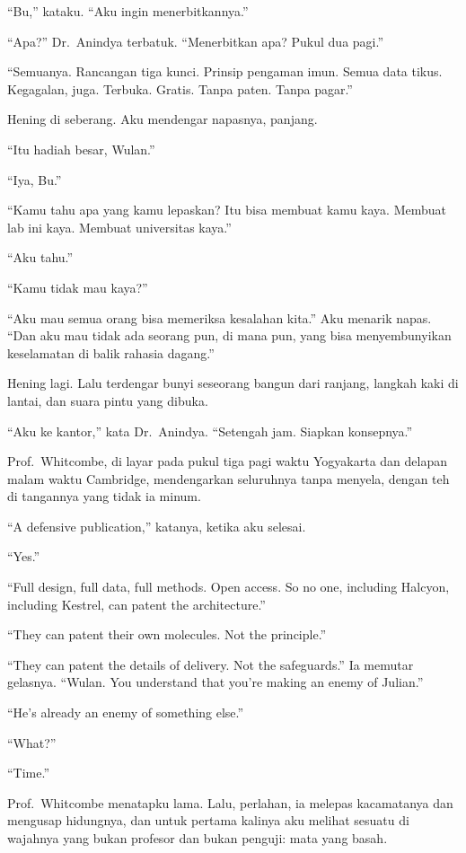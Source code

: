 \documentclass[11pt,twoside,openany]{book}
\makeatletter
\newcommand{\scenebreak}{\par\vspace{0.9em}{\centering\textsc{*\hspace{0.7em}*\hspace{0.7em}*}\par}\vspace{0.9em}\@afterindentfalse\@afterheading}
\makeatother
\begin{document}
``Bu,'' kataku. ``Aku ingin menerbitkannya.''

``Apa?'' Dr.~Anindya terbatuk. ``Menerbitkan apa? Pukul dua pagi.''

``Semuanya. Rancangan tiga kunci. Prinsip pengaman imun. Semua data tikus. Kegagalan, juga. Terbuka. Gratis. Tanpa paten. Tanpa pagar.''

Hening di seberang. Aku mendengar napasnya, panjang.

``Itu hadiah besar, Wulan.''

``Iya, Bu.''

``Kamu tahu apa yang kamu lepaskan? Itu bisa membuat kamu kaya. Membuat lab ini kaya. Membuat universitas kaya.''

``Aku tahu.''

``Kamu tidak mau kaya?''

``Aku mau semua orang bisa memeriksa kesalahan kita.'' Aku menarik napas. ``Dan aku mau tidak ada seorang pun, di mana pun, yang bisa menyembunyikan keselamatan di balik rahasia dagang.''

Hening lagi. Lalu terdengar bunyi seseorang bangun dari ranjang, langkah kaki di lantai, dan suara pintu yang dibuka.

``Aku ke kantor,'' kata Dr.~Anindya. ``Setengah jam. Siapkan konsepnya.''

\scenebreak
Prof.~Whitcombe, di layar pada pukul tiga pagi waktu Yogyakarta dan delapan malam waktu Cambridge, mendengarkan seluruhnya tanpa menyela, dengan teh di tangannya yang tidak ia minum.

``A defensive publication,'' katanya, ketika aku selesai.

``Yes.''

``Full design, full data, full methods. Open access. So no one, including Halcyon, including Kestrel, can patent the architecture.''

``They can patent their own molecules. Not the principle.''

``They can patent the details of delivery. Not the safeguards.'' Ia memutar gelasnya. ``Wulan. You understand that you're making an enemy of Julian.''

``He's already an enemy of something else.''

``What?''

``Time.''

Prof.~Whitcombe menatapku lama. Lalu, perlahan, ia melepas kacamatanya dan mengusap hidungnya, dan untuk pertama kalinya aku melihat sesuatu di wajahnya yang bukan profesor dan bukan penguji: mata yang basah.
\end{document}
